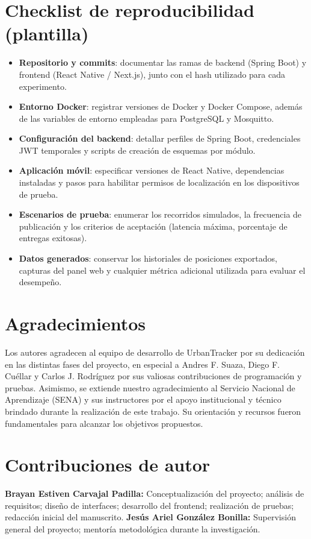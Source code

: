 \appendix
\section{Checklist de reproducibilidad (plantilla)}
\begin{itemize}[leftmargin=*]
  \item \textbf{Repositorio y commits}: documentar las ramas de backend (Spring Boot) y frontend (React Native / Next.js), junto con el hash utilizado para cada experimento.
  \item \textbf{Entorno Docker}: registrar versiones de Docker y Docker Compose, además de las variables de entorno empleadas para PostgreSQL y Mosquitto.
  \item \textbf{Configuración del backend}: detallar perfiles de Spring Boot, credenciales JWT temporales y scripts de creación de esquemas por módulo.
  \item \textbf{Aplicación móvil}: especificar versiones de React Native, dependencias instaladas y pasos para habilitar permisos de localización en los dispositivos de prueba.
  \item \textbf{Escenarios de prueba}: enumerar los recorridos simulados, la frecuencia de publicación y los criterios de aceptación (latencia máxima, porcentaje de entregas exitosas).
  \item \textbf{Datos generados}: conservar los historiales de posiciones exportados, capturas del panel web y cualquier métrica adicional utilizada para evaluar el desempeño.
\end{itemize}

\section{Agradecimientos}
Los autores agradecen al equipo de desarrollo de UrbanTracker por su dedicación en las distintas fases del proyecto, en especial a Andres F. Suaza, Diego F. Cuéllar y Carlos J. Rodríguez por sus valiosas contribuciones de programación y pruebas. Asimismo, se extiende nuestro agradecimiento al Servicio Nacional de Aprendizaje (SENA) y sus instructores por el apoyo institucional y técnico brindado durante la realización de este trabajo. Su orientación y recursos fueron fundamentales para alcanzar los objetivos propuestos.

\section{Contribuciones de autor}
\textbf{Brayan Estiven Carvajal Padilla:} Conceptualización del proyecto; análisis de requisitos; diseño de interfaces; desarrollo del frontend; realización de pruebas; redacción inicial del manuscrito.
\textbf{Jesús Ariel González Bonilla:} Supervisión general del proyecto; mentoría metodológica durante la investigación.
